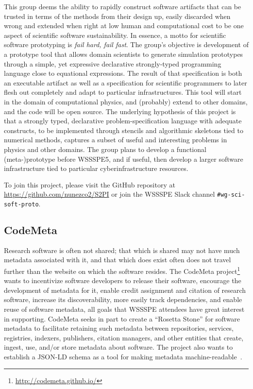 \documentclass[11pt, oneside]{amsart}
\newcommand{\note}[1]{ {\textcolor{blueish}    { ***Note:      #1 }}}
\begin{document}
This group deems the ability to rapidly construct software artifacts that can be
trusted in terms of the methods from their design up, easily discarded when
wrong and extended when right at low human and computational cost to be one
aspect of scientific software sustainability. In essence,
a motto for scientific software prototyping is \textit{fail hard, fail fast}.
%
The group's objective is development of a prototype tool that allows domain scientists to generate
simulation prototypes through a simple, yet expressive declarative
strongly-typed programming language close to equational expressions. The result
of that specification is both an executable artifact as well as a specification
for scientific programmers to later flesh out completely and adapt to particular
infrastructures. This tool will start in the domain of computational physics,
and (probably) extend to other domains, and the code will be open source.
%
The underlying hypothesis of this project is that a strongly typed, declarative
problem-specification language with adequate constructs, to be implemented
through stencils and algorithmic skeletons tied to numerical methods, captures a
 subset of useful and interesting problems in physics and other domains.
%
The group plans to develop a functional (meta-)prototype before WSSSPE5, and
if useful, then develop a larger software infrastructure tied to
particular cyberinfrastructure resources.

To join this project, please visit the GitHub repository at
\url{https://github.com/nunezco2/S2PI} or join the WSSSPE Slack channel
\texttt{\#wg-sci-soft-proto}.


\subsection{CodeMeta}
\label{sec:CodeMeta}


Research software is often not shared; that which is shared may not have much metadata associated with it, and that which does exist often does not travel further than the website on which the software resides. The CodeMeta project\footnote{\url{http://codemeta.github.io/}} wants to incentivize software developers to release their software, encourage the development of metadata for it, enable credit assignment and citation of research software, increase its discoverability, more easily track dependencies, and enable reuse of software metadata, all goals that WSSSPE attendees have great interest in supporting.  CodeMeta seeks in part to create a ``Rosetta Stone'' for software metadata to facilitate retaining such metadata between repositories, services, registries, indexers, publishers, citation managers, and other entities that create, ingest, use, and/or store metadata about software. The project also wants to establish a JSON-LD schema as a tool for making metadata machine-readable~\cite{CodeMeta_schema}.
 
\end{document}
